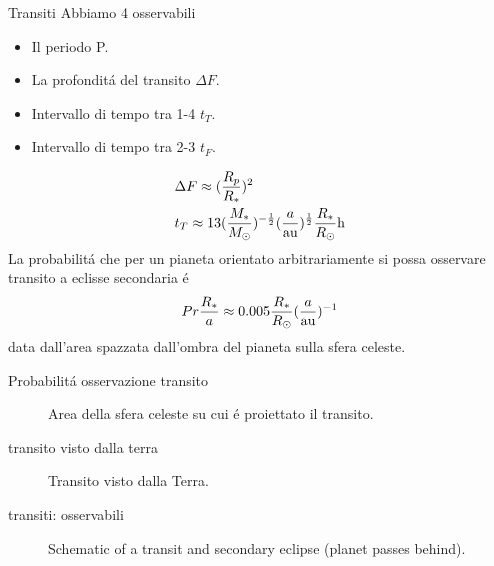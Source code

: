 \begin{frame}{Transiti}
Abbiamo 4 osservabili
\begin{itemize}
    \item Il periodo P.
    \item La profondit\'a del transito $\Delta F$.
    \item Intervallo di tempo tra 1-4 $t_T$.
    \item Intervallo di tempo tra 2-3 $t_F$.
\end{itemize}
\begin{align*}
&\Delta F\approx(\frac{R_p}{R_*})^2\\
&t_T\approx13(\frac{M_*}{\msun{}})\expy{-\frac{1}{2}}(\frac{a}{\si{\astronomicalunit}})\expy{\frac{1}{2}}\frac{R_*}{\rsun{}}\si{\hour}
\end{align*}
La probabilit\'a che per un pianeta orientato arbitrariamente si possa osservare transito a eclisse secondaria \'e
\begin{equation*}
Pr\frac{R_*}{a}\approx0.005\frac{R_*}{\rsun{}}(\frac{a}{\si{\astronomicalunit}})\expy{-1}
\end{equation*}
data dall'area spazzata dall'ombra del pianeta sulla sfera celeste.
\end{frame}

\begin{wordonframe}{Probabilit\'a osservazione transito}
\begin{figure}[!ht]
\centering
\caption{Area della sfera celeste su cui \'e proiettato il transito.}
\end{figure}
\end{wordonframe}

\begin{wordonframe}{transito visto dalla terra}
\begin{figure}[!ht]
\centering
\caption{Transito visto dalla Terra.}
\end{figure}
\end{wordonframe}

\begin{wordonframe}{transiti: osservabili}
\begin{figure}[!ht]
\centering
\caption{Schematic of a transit and secondary eclipse (planet passes behind).}
\end{figure}
\end{wordonframe}

